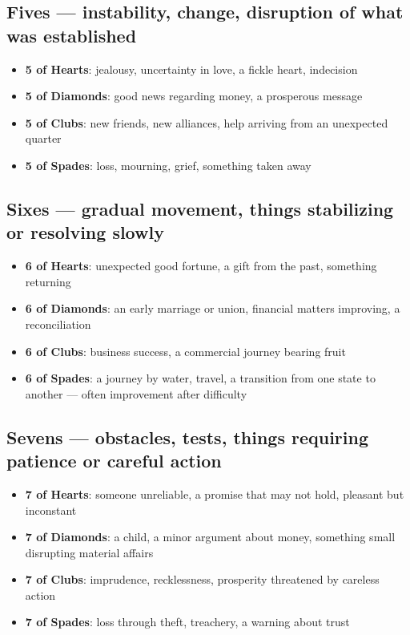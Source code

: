 \subsection{Fives --- instability, change, disruption of what was established}\label{fives--instability-change-disruption-of-what-was-established}

\begin{itemize}
\tightlist
\item
  \textbf{5 of Hearts}: jealousy, uncertainty in love, a fickle heart, indecision
\item
  \textbf{5 of Diamonds}: good news regarding money, a prosperous message
\item
  \textbf{5 of Clubs}: new friends, new alliances, help arriving from an unexpected quarter
\item
  \textbf{5 of Spades}: loss, mourning, grief, something taken away
\end{itemize}

\subsection{Sixes --- gradual movement, things stabilizing or resolving slowly}\label{sixes--gradual-movement-things-stabilizing-or-resolving-slowly}

\begin{itemize}
\tightlist
\item
  \textbf{6 of Hearts}: unexpected good fortune, a gift from the past, something returning
\item
  \textbf{6 of Diamonds}: an early marriage or union, financial matters improving, a reconciliation
\item
  \textbf{6 of Clubs}: business success, a commercial journey bearing fruit
\item
  \textbf{6 of Spades}: a journey by water, travel, a transition from one state to another --- often improvement after difficulty
\end{itemize}

\subsection{Sevens --- obstacles, tests, things requiring patience or careful action}\label{sevens--obstacles-tests-things-requiring-patience-or-careful-action}

\begin{itemize}
\tightlist
\item
  \textbf{7 of Hearts}: someone unreliable, a promise that may not hold, pleasant but inconstant
\item
  \textbf{7 of Diamonds}: a child, a minor argument about money, something small disrupting material affairs
\item
  \textbf{7 of Clubs}: imprudence, recklessness, prosperity threatened by careless action
\item
  \textbf{7 of Spades}: loss through theft, treachery, a warning about trust
\end{itemize}

